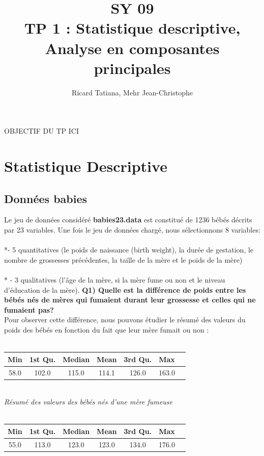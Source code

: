 \documentclass[a4paper, 9pt]{article}
\title{SY 09 \\TP 1 :  Statistique descriptive, Analyse en composantes principales}
\author{Ricard Tatiana, Mehr Jean-Christophe}
\begin{document}
\maketitle

OBJECTIF DU TP ICI

\section{Statistique Descriptive}
\subsection{Donn\'ees babies}

Le jeu de données considéré
\textbf{ babies23.data}
est constitué de 1236 bébés décrits par 23 variables. Une fois le jeu de données chargé, nous sélectionnons 8 variables:\\
\\*-  5 quantitatives (le poids de naissance (birth weight), la dur\'ee de gestation, le nombre de grossesses pr\'ec\'edentes,
la taille de la m\`ere et le poids de la m\`ere)\\
\\* - 3 qualitatives (l'\^age de la m\`ere,
si la m\`ere fume ou non et le niveau d'\'education de la m\`ere).
\newline
\newline\textbf{Q1) Quelle est la différence de poids entre les bébés nés de mères qui fumaient durant leur grossesse
et celles qui ne fumaient pas?}\\
Pour observer cette différence, nous pouvons étudier le résumé des valeurs du poids des b\'eb\'es en fonction du fait
que leur m\`ere fumait ou non :\\ \\
\begin{tabular}{|c|c|c|c|c|c|c|}
\hline
Min & 1st Qu. & Median & Mean & 3rd Qu. & Max \\
\hline
58.0 & 102.0 & 115.0 & 114.1 & 126.0 & 163.0 \\
\hline
\end{tabular}\\
\textit{R\'esum\'e des valeurs des b\'eb\'es n\'es d'une m\`ere fumeuse}\\ \\
\begin{tabular}{|c|c|c|c|c|c|c|}
\hline
Min & 1st Qu. & Median & Mean & 3rd Qu. & Max \\
\hline
55.0 & 113.0 & 123.0 & 123.0 & 134.0 & 176.0 \\
\hline
\end{tabular}\\
\end{document}
